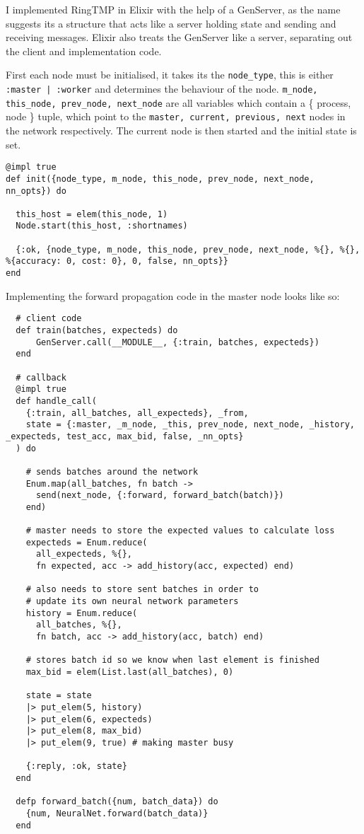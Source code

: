 I implemented RingTMP in Elixir with the help of a GenServer, as the name
suggests its a structure that acts like a server holding state and sending and
receiving messages. Elixir also treats the GenServer like a server, separating
out the client and implementation code.

First each node must be initialised, it takes its the \lstinline{node_type},
this is either \lstinline{:master | :worker} and determines the behaviour of the
node. \lstinline{m_node, this_node, prev_node, next_node} are all variables which
contain a \{ process, node \} tuple, which point to the 
\lstinline{master, current, previous, next} nodes in the network respectively.
The current node is then started and the initial state is set.
\begin{lstlisting}
@impl true
def init({node_type, m_node, this_node, prev_node, next_node, nn_opts}) do
  
  this_host = elem(this_node, 1)
  Node.start(this_host, :shortnames)
  
  {:ok, {node_type, m_node, this_node, prev_node, next_node, %{}, %{}, %{accuracy: 0, cost: 0}, 0, false, nn_opts}}
end
\end{lstlisting}
\clearpage
Implementing the forward propagation code in the master node looks like so:
\begin{lstlisting}
  # client code
  def train(batches, expecteds) do
      GenServer.call(__MODULE__, {:train, batches, expecteds})
  end

  # callback
  @impl true
  def handle_call(
    {:train, all_batches, all_expecteds}, _from,
    state = {:master, _m_node, _this, prev_node, next_node, _history, _expecteds, test_acc, max_bid, false, _nn_opts}
  ) do

    # sends batches around the network
    Enum.map(all_batches, fn batch ->
      send(next_node, {:forward, forward_batch(batch)})
    end)

    # master needs to store the expected values to calculate loss
    expecteds = Enum.reduce(
      all_expecteds, %{},
      fn expected, acc -> add_history(acc, expected) end)

    # also needs to store sent batches in order to
    # update its own neural network parameters
    history = Enum.reduce(
      all_batches, %{},
      fn batch, acc -> add_history(acc, batch) end)

    # stores batch id so we know when last element is finished
    max_bid = elem(List.last(all_batches), 0)

    state = state
    |> put_elem(5, history)
    |> put_elem(6, expecteds)
    |> put_elem(8, max_bid)
    |> put_elem(9, true) # making master busy

    {:reply, :ok, state}
  end

  defp forward_batch({num, batch_data}) do
    {num, NeuralNet.forward(batch_data)}
  end
\end{lstlisting}
